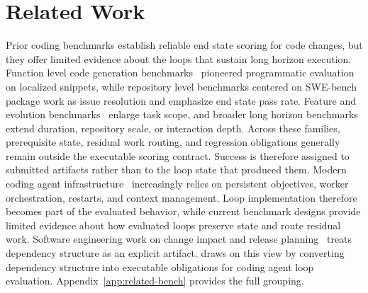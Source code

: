 \vspace{-4pt}
\section{Related Work}\label{sec:related}

Prior coding benchmarks establish reliable end state scoring for code changes, but they offer limited evidence about the loops that sustain long horizon execution. Function level code generation benchmarks~\citep{chen2021evaluating} pioneered programmatic evaluation on localized snippets, while repository level benchmarks centered on SWE-bench~\citep{jimenez2023swe} package work as issue resolution and emphasize end state pass rate.
Feature and evolution benchmarks~\citep{zhou2026featurebench} enlarge task scope, and broader long horizon benchmarks~\citep{kwa2025measuring} extend duration, repository scale, or interaction depth.
Across these families, prerequisite state, residual work routing, and regression obligations generally remain outside the executable scoring contract. Success is therefore assigned to submitted artifacts rather than to the loop state that produced them.
Modern coding agent infrastructure~\citep{claude_code,openai_codex_prompting,anthropic_claude_code_workflows,huntley_ralph_loop} increasingly relies on persistent objectives, worker orchestration, restarts, and context management. Loop implementation therefore becomes part of the evaluated behavior, while current benchmark designs provide limited evidence about how evaluated loops preserve state and route residual work.
Software engineering work on change impact and release planning~\citep{lehnert2011taxonomy} treats dependency structure as an explicit artifact. \lhb{} draws on this view by converting dependency structure into executable obligations for coding agent loop evaluation. Appendix~\ref{app:related-bench} provides the full grouping.
